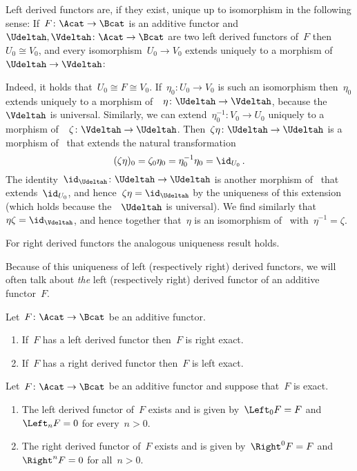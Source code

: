 \begin{remark}
  Left derived functors are, if they exist, unique up to isomorphism in the following sense:
  If~$F \colon \Acat \to \Bcat$ is an additive functor and~$\Udeltah, \Vdeltah \colon \Acat \to \Bcat$ are two left derived functors of~$F$ then~$U_0 \cong V_0$, and every isomorphism~$U_0 \to V_0$ extends uniquely to a morphism of~{\deltafuns}~$\Udeltah \to \Vdeltah$:
  
  Indeed, it holds that~$U_0 \cong F \cong V_0$.
  If~$\eta_0 \colon U_0 \to V_0$ is such an isomorphism then~$\eta_0$ extends uniquely to a morphism of~{\deltafuns}~$\eta \colon \Udeltah \to \Vdeltah$, because the~{\deltafun}~$\Vdeltah$ is universal.
  Similarly, we can extend~$\eta_0^{-1} \colon V_0 \to U_0$ uniquely to a morphism of~{\deltafuns}~$\zeta \colon \Vdeltah \to \Udeltah$.
  Then~$\zeta \eta \colon \Udeltah \to \Udeltah$ is a morphism of~{\deltafuns} that extends the natural transformation
  \[
      (\zeta \eta)_0
    = \zeta_0 \eta_0
    = \eta_0^{-1} \eta_0
    = \id_{U_0} \,.
  \]
  The identity~$\id_{\Udeltah} \colon \Udeltah \to \Udeltah$ is another morphism of~{\deltafuns} that extends~$\id_{U_0}$, and hence~$\zeta \eta = \id_{\Udeltah}$ by the uniqueness of this extension (which holds because the~{\deltafun}~$\Udeltah$ is universal).
  We find similarly that~$\eta \zeta = \id_{\Vdeltah}$, and hence together that~$\eta$ is an isomorphism of~{\deltafuns} with~$\eta^{-1} = \zeta$.
  
  For right derived functors the analogous uniqueness result holds.
\end{remark}


\begin{notation*}
  Because of this uniqueness of left (respectively right) derived functors, we will often talk about \emph{the} left (respectively right) derived functor of an additive functor~$F$.
\end{notation*}


\begin{remark}
  Let~$F \colon \Acat \to \Bcat$ be an additive functor.
  \begin{enumerate}
    \item
      If~$F$ has a left derived functor then~$F$ is right exact.
    \item
      If~$F$ has a right derived functor then~$F$ is left exact.
  \end{enumerate}
\end{remark}


\begin{lemma}
  Let~$F \colon \Acat \to \Bcat$ be an additive functor and suppose that~$F$ is exact.
  \begin{enumerate}
    \item
      \label{left derived for exact}
      The left derived functor of~$F$ exists and is given by~$\Left_0 F = F$ and~$\Left_n F = 0$ for every~$n > 0$.
    \item
      \label{right derived for exact}
      The right derived functor of~$F$ exists and is given by~$\Right^0 F = F$ and~$\Right^n F = 0$ for all~$n > 0$.
  \end{enumerate}
\end{lemma}


